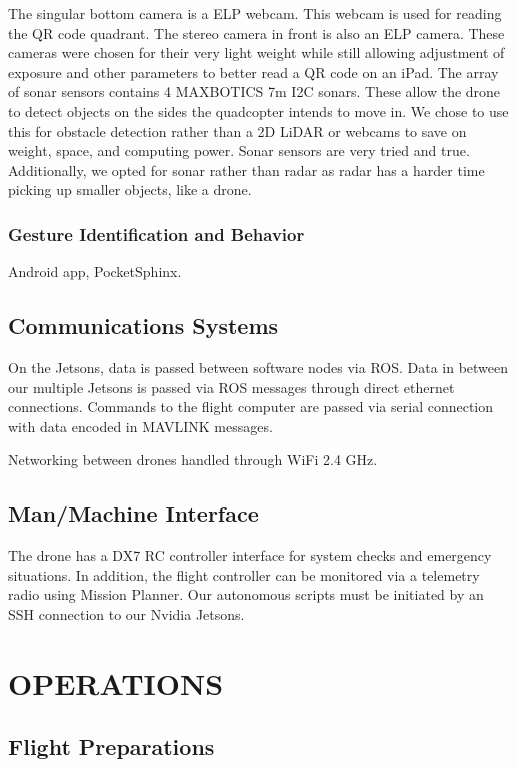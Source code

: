 \documentclass[12pt,letterpaper]{article}
\begin{document}
			The singular bottom camera is a ELP webcam. This webcam is used for reading the QR code quadrant. The stereo camera in front is also an ELP camera. These cameras were chosen for their very light weight while still allowing adjustment of exposure and other parameters to better read a QR code on an iPad. 
			The array of sonar sensors contains 4 MAXBOTICS 7m I2C sonars. These allow the drone to detect objects on the sides the quadcopter intends to move in. We chose to use this for obstacle detection rather than a 2D LiDAR or webcams to save on weight, space, and computing power. Sonar sensors are very tried and true. Additionally, we opted for sonar rather than radar as radar has a harder time picking up smaller objects, like a drone. 
			
		\subsubsection*{Gesture Identification and Behavior}
			Android app, PocketSphinx. 

	\subsection*{Communications Systems}
		On the Jetsons, data is passed between software nodes via ROS. Data in between our multiple Jetsons is passed via ROS messages through direct ethernet connections. Commands to the flight computer are passed via serial connection with data encoded in MAVLINK messages.
		
		Networking between drones handled through WiFi 2.4 GHz. 


	\subsection*{Man/Machine Interface}
		The drone has a DX7 RC controller interface for system checks and emergency situations. In addition, the flight controller can be monitored via a telemetry radio using Mission Planner. Our autonomous scripts must be initiated by an SSH connection to our Nvidia Jetsons.

\section*{OPERATIONS}
	\subsection*{Flight Preparations}
\end{document}
